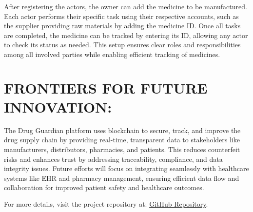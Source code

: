 \documentclass[runningheads]{llncs}
\begin{document}
After registering the actors, the owner can add the medicine to be manufactured. Each actor performs their specific task using their respective accounts, such as the supplier providing raw materials by adding the medicine ID. Once all tasks are completed, the medicine can be tracked by entering its ID, allowing any actor to check its status as needed. This setup ensures clear roles and responsibilities among all involved parties while enabling efficient tracking of medicines.


\section{FRONTIERS FOR FUTURE INNOVATION:}
The Drug Guardian platform uses blockchain to secure, track, and improve the drug supply chain by providing real-time, transparent data to stakeholders like manufacturers, distributors, pharmacies, and patients. This reduces counterfeit risks and enhances trust by addressing traceability, compliance, and data integrity issues. Future efforts will focus on integrating seamlessly with healthcare systems like EHR and pharmacy management, ensuring efficient data flow and collaboration for improved patient safety and healthcare outcomes.

For more details, visit the project repository at: \href{https://github.com/tanishka786/Drug_Blockchain.git}{GitHub Repository}.
\end{document}
